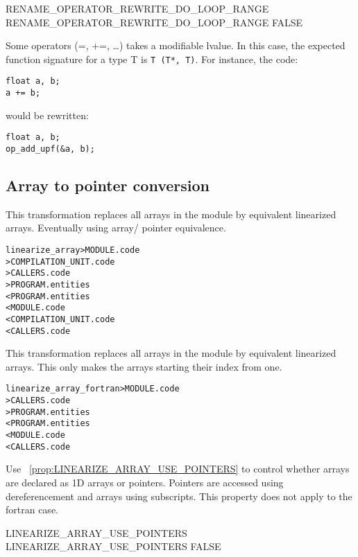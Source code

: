 \documentclass[a4paper]{report}
\newenvironment{PipsMake}{\begin{alltt}}{\end{alltt}}
\newcommand{\PipsPropRef}[1]{\texttt{\detokenize{#1}}~\ref{prop:#1}}
\newenvironment{PipsPass}[1]{\label{pass:#1}}{}
\begin{document}
\begin{PipsProp}{RENAME_OPERATOR_REWRITE_DO_LOOP_RANGE}
RENAME_OPERATOR_REWRITE_DO_LOOP_RANGE FALSE
\end{PipsProp}

Some operators (=, +=, \ldots) takes a modifiable lvalue. In this case, the expected function signature for a type T is \lstinline$T (T*, T)$.
For instance, the code:
\begin{lstlisting}
float a, b;
a += b;
\end{lstlisting}
would be rewritten:
\begin{lstlisting}
float a, b;
op_add_upf(&a, b);
\end{lstlisting}

\subsection{Array to pointer conversion}

\begin{PipsPass}{linearize_array}
This transformation replaces all arrays in the module by equivalent linearized
arrays.
Eventually using array/ pointer equivalence.
\end{PipsPass}

\begin{PipsMake}
linearize_array > MODULE.code
                 > COMPILATION_UNIT.code
				 > CALLERS.code
		         > PROGRAM.entities
		< PROGRAM.entities
		< MODULE.code
        < COMPILATION_UNIT.code
		< CALLERS.code
\end{PipsMake}

\begin{PipsPass}{linearize_array_fortran}
This transformation replaces all arrays in the module by equivalent linearized
arrays. This only makes the arrays starting their index from one.
\end{PipsPass}

\begin{PipsMake}
linearize_array_fortran > MODULE.code
                        > CALLERS.code
		        > PROGRAM.entities
		        < PROGRAM.entities
		        < MODULE.code
		        < CALLERS.code
\end{PipsMake}

Use \PipsPropRef{LINEARIZE_ARRAY_USE_POINTERS} to control whether arrays are
declared as 1D arrays or pointers. Pointers are accessed using dereferencement
and arrays using subscripts. This property does not apply to the fortran case.
\begin{PipsProp}{LINEARIZE_ARRAY_USE_POINTERS}
LINEARIZE_ARRAY_USE_POINTERS FALSE
\end{PipsProp}
\end{document}
